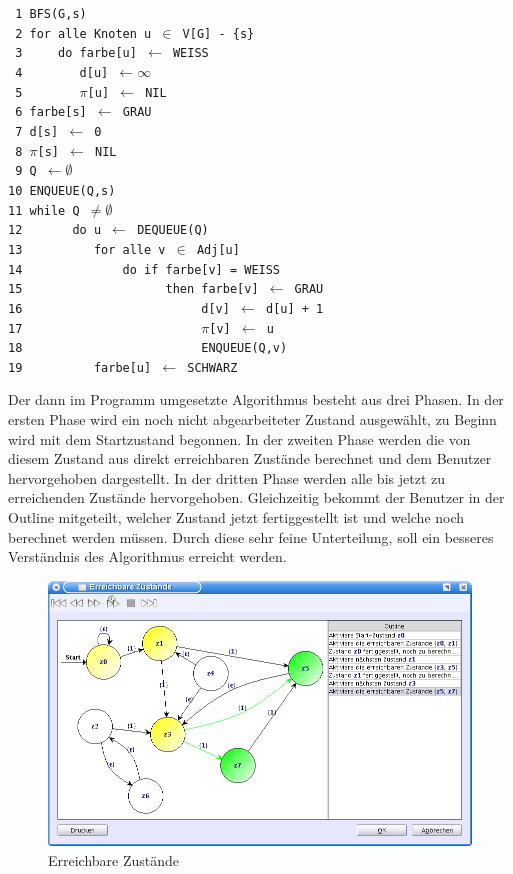 \noindent
\verb| 1 BFS(G,s)|\\
\verb| 2 for alle Knoten u |$\in$\verb| V[G] - {s}|\\
\verb| 3     do farbe[u] |$\gets$\verb| WEISS|\\
\verb| 4        d[u] |$\gets \infty$\\
\verb| 5        |$\pi$\verb|[u] |$\gets$\verb| NIL|\\
\verb| 6 farbe[s] |$\gets$\verb| GRAU|\\
\verb| 7 d[s] |$\gets$\verb| 0|\\
\verb| 8 |$\pi$\verb|[s] |$\gets$\verb| NIL|\\
\verb| 9 Q |$\gets \emptyset$\\
\verb|10 ENQUEUE(Q,s)|\\
\verb|11 while Q |$\neq \emptyset$\\
\verb|12       do u |$\gets$\verb| DEQUEUE(Q)|\\
\verb|13          for alle v |$\in$\verb| Adj[u]|\\
\verb|14              do if farbe[v] = WEISS|\\
\verb|15                    then farbe[v] |$\gets$\verb| GRAU|\\
\verb|16                         d[v] |$\gets$\verb| d[u] + 1|\\
\verb|17                         |$\pi$\verb|[v] |$\gets$\verb| u|\\
\verb|18                         ENQUEUE(Q,v)|\\
\verb|19          farbe[u] |$\gets$\verb| SCHWARZ|\\
\vspace{10pt}

Der dann im Programm umgesetzte Algorithmus besteht aus drei Phasen. In der
ersten Phase wird ein noch nicht abgearbeiteter Zustand ausgewählt, zu Beginn
wird mit dem Startzustand begonnen. In der zweiten Phase werden die von diesem
Zustand aus direkt erreichbaren Zustände berechnet und dem Benutzer hervorgehoben
dargestellt. In der dritten Phase werden alle bis jetzt zu erreichenden Zustände
hervorgehoben. Gleichzeitig bekommt der Benutzer in der Outline mitgeteilt,
welcher Zustand jetzt fertiggestellt ist und welche noch berechnet werden müssen.
Durch diese sehr feine Unterteilung, soll ein besseres Verständnis des
Algorithmus erreicht werden.\vspace{10pt}

\begin{figure}[h!]
\begin{center}
\includegraphics[width=12cm]{../images/reachable_states.png}
\caption{Erreichbare Zustände}
\end{center}
\end{figure}
\vspace{10pt}
